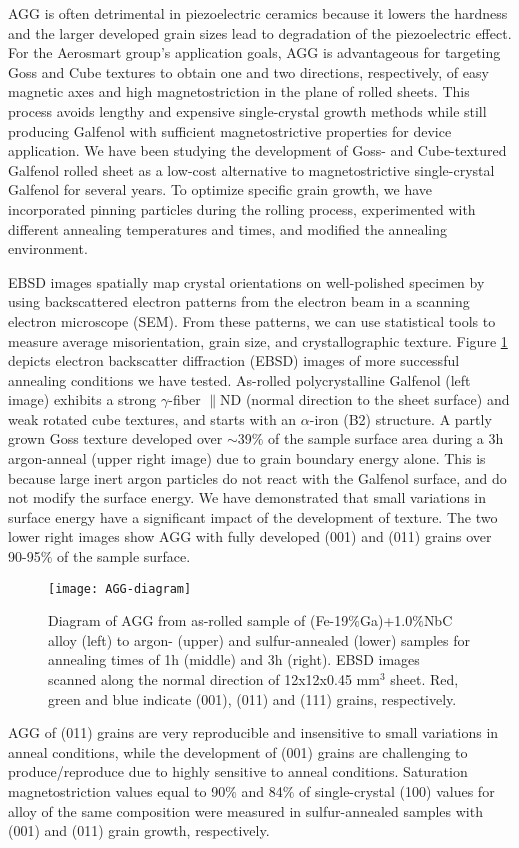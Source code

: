  AGG is often detrimental in piezoelectric ceramics because it lowers the hardness and the larger developed grain sizes lead to degradation of the piezoelectric effect.\cite{Bing2014} For the Aerosmart group's application goals, AGG is advantageous for targeting Goss  and Cube  textures to obtain one and two directions, respectively, of easy magnetic axes and high magnetostriction in the plane of rolled sheets. This process avoids lengthy and expensive single-crystal growth methods while still producing Galfenol with sufficient magnetostrictive properties for device application. We have been studying the development of Goss- and Cube-textured Galfenol rolled sheet as a low-cost alternative to magnetostrictive single-crystal Galfenol for several years. To optimize specific grain growth, we have  incorporated pinning particles during the rolling process, experimented with different annealing temperatures and times, and modified the annealing environment.\cite{Na2007b,Na2008,Na2009,Na2012} 

 EBSD images spatially map crystal orientations on well-polished specimen by using backscattered electron patterns from the electron beam in a scanning electron microscope (SEM). From these patterns, we can use statistical tools to measure average misorientation, grain size, and crystallographic texture. Figure \ref{fig:AGG-diagram} depicts electron backscatter diffraction (EBSD) images of more successful annealing conditions we have tested. As-rolled polycrystalline Galfenol (left image) exhibits a strong $\gamma$-fiber $ \parallel $ND (normal direction to the sheet surface) and weak rotated cube textures, and starts with an $\alpha$-iron (B2) structure. A partly grown Goss texture developed over $\sim$39$\%$ of the sample surface area during a 3h argon-anneal (upper right image) due to grain boundary energy alone. This is because large inert argon particles do not react with the Galfenol surface, and do not modify the surface energy. We have demonstrated that small variations in surface energy have a significant impact of the development of texture.\cite{Chun2010,Na2012b} The two lower right images show AGG with fully developed \hkl(001) and \hkl(011) grains over 90-95$ \% $ of the sample surface. 
\begin{figure}
	\centering
	\texttt{[image: AGG-diagram]}
	\caption{Diagram of AGG from as-rolled sample of (Fe-19$\%$Ga)+1.0$\%$NbC alloy (left) to argon- (upper) and sulfur-annealed (lower) samples for annealing times of 1h (middle) and 3h (right). EBSD images scanned along the normal direction of 12x12x0.45 mm$^{3}$ sheet. Red, green and blue indicate \hkl(001), \hkl(011) and \hkl(111) grains, respectively. 
	}
	\label{fig:AGG-diagram}	
\end{figure}
 AGG of (011) grains are very reproducible and insensitive to small variations in anneal conditions, while the development of (001) grains are challenging to produce/reproduce due to highly sensitive to anneal conditions. Saturation magnetostriction values equal to 90$ \% $ and 84$ \% $ of single-crystal \hkl(100) values for alloy of the same composition were measured in sulfur-annealed samples with \hkl(001) and \hkl(011) grain growth, respectively.  

